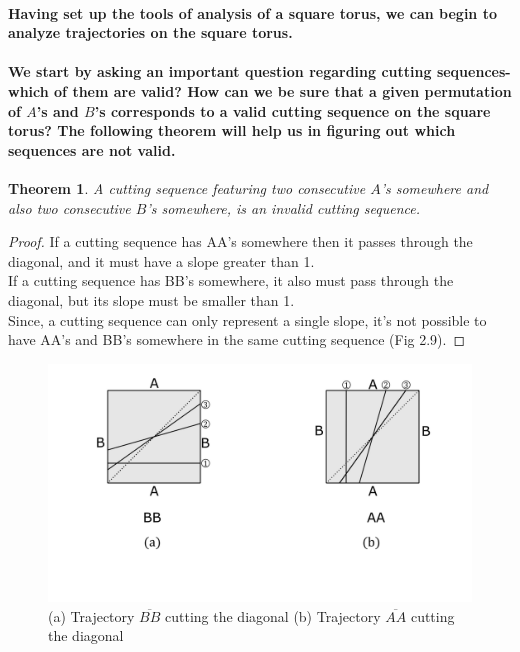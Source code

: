 \documentclass{report}
\newtheorem{theorem}{Theorem}[chapter]
\begin{document}
\paragraph{Having set up the tools of analysis of a square torus, we can begin to analyze trajectories on the square torus. 
\\ \\
We start by asking an important question regarding cutting sequences- which of them are valid? How can we be sure that a given permutation of $A$’s and $B$’s corresponds to a valid cutting sequence on the square torus? The following theorem will help us in figuring out which sequences are not valid.}

\begin{theorem}
A cutting sequence featuring two consecutive $A$’s somewhere and also two consecutive $B$’s somewhere, is an invalid cutting sequence.
\end{theorem}

\begin{proof}
If a cutting sequence has AA’s somewhere then it passes through the diagonal, and it must have a slope greater than 1. \\ 
If a cutting sequence has BB’s somewhere, it also must pass through the diagonal, but its slope must be smaller than 1. \\ 
Since, a cutting sequence can only represent a single slope, it's not possible to have AA’s and BB’s somewhere in the same cutting sequence (Fig 2.9).
\end{proof}

\begin{figure}[h] 
\begin{center}
\includegraphics[scale=0.3]{2.9}
\caption{(a) Trajectory $\overline{BB}$ cutting the diagonal (b) Trajectory $\overline{AA}$ cutting the diagonal
}
\end{center}
\end{figure}
\end{document}
